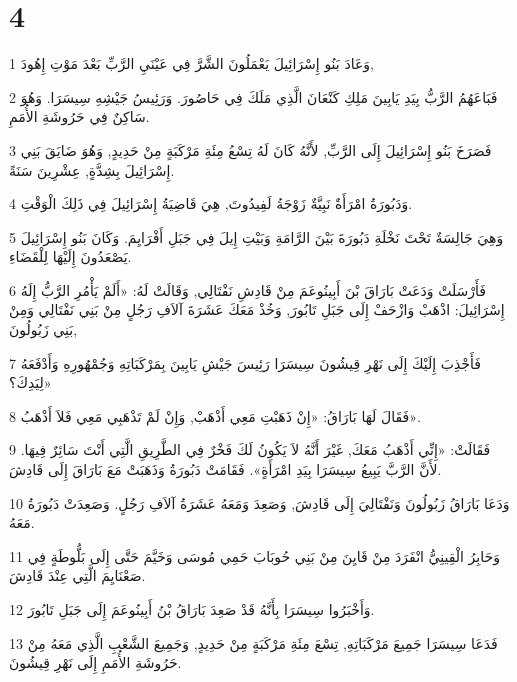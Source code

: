 \chapter{4}

\par 1 وَعَادَ بَنُو إِسْرَائِيلَ يَعْمَلُونَ الشَّرَّ فِي عَيْنَيِ الرَّبِّ بَعْدَ مَوْتِ إِهُودَ,
\par 2 فَبَاعَهُمُ الرَّبُّ بِيَدِ يَابِينَ مَلِكِ كَنْعَانَ الَّذِي مَلَكَ فِي حَاصُورَ. وَرَئِيسُ جَيْشِهِ سِيسَرَا. وَهُوَ سَاكِنٌ فِي حَرُوشَةِ الأُمَمِ.
\par 3 فَصَرَخَ بَنُو إِسْرَائِيلَ إِلَى الرَّبِّ, لأَنَّهُ كَانَ لَهُ تِسْعُ مِئَةِ مَرْكَبَةٍ مِنْ حَدِيدٍ, وَهُوَ ضَايَقَ بَنِي إِسْرَائِيلَ بِشِدَّةٍ, عِشْرِينَ سَنَةً.
\par 4 وَدَبُورَةُ امْرَأَةٌ نَبِيَّةٌ زَوْجَةُ لَفِيدُوتَ, هِيَ قَاضِيَةُ إِسْرَائِيلَ فِي ذَلِكَ الْوَقْتِ.
\par 5 وَهِيَ جَالِسَةٌ تَحْتَ نَخْلَةِ دَبُورَةَ بَيْنَ الرَّامَةِ وَبَيْتِ إِيلَ فِي جَبَلِ أَفْرَايِمَ. وَكَانَ بَنُو إِسْرَائِيلَ يَصْعَدُونَ إِلَيْهَا لِلْقَضَاءِ.
\par 6 فَأَرْسَلَتْ وَدَعَتْ بَارَاقَ بْنَ أَبِينُوعَمَ مِنْ قَادِشِ نَفْتَالِي, وَقَالَتْ لَهُ: «أَلَمْ يَأْمُرِ الرَّبُّ إِلَهُ إِسْرَائِيلَ: اذْهَبْ وَازْحَفْ إِلَى جَبَلِ تَابُورَ, وَخُذْ مَعَكَ عَشَرَةَ آلاَفِ رَجُلٍ مِنْ بَنِي نَفْتَالِي وَمِنْ بَنِي زَبُولُونَ,
\par 7 فَأَجْذِبَ إِلَيْكَ إِلَى نَهْرِ قِيشُونَ سِيسَرَا رَئِيسَ جَيْشِ يَابِينَ بِمَرْكَبَاتِهِ وَجُمْهُورِهِ وَأَدْفَعَهُ لِيَدِكَ؟»
\par 8 فَقَالَ لَهَا بَارَاقُ: «إِنْ ذَهَبْتِ مَعِي أَذْهَبْ, وَإِنْ لَمْ تَذْهَبِي مَعِي فَلاَ أَذْهَبُ».
\par 9 فَقَالَتْ: «إِنِّي أَذْهَبُ مَعَكَ, غَيْرَ أَنَّهُ لاَ يَكُونُ لَكَ فَخْرٌ فِي الطَّرِيقِ الَّتِي أَنْتَ سَائِرٌ فِيهَا. لأَنَّ الرَّبَّ يَبِيعُ سِيسَرَا بِيَدِ امْرَأَةٍ». فَقَامَتْ دَبُورَةُ وَذَهَبَتْ مَعَ بَارَاقَ إِلَى قَادِشَ.
\par 10 وَدَعَا بَارَاقُ زَبُولُونَ وَنَفْتَالِيَ إِلَى قَادِشَ, وَصَعِدَ وَمَعَهُ عَشَرَةُ آلاَفِ رَجُلٍ. وَصَعِدَتْ دَبُورَةُ مَعَهُ.
\par 11 وَحَابِرُ الْقِينِيُّ انْفَرَدَ مِنْ قَايِنَ مِنْ بَنِي حُوبَابَ حَمِي مُوسَى وَخَيَّمَ حَتَّى إِلَى بَلُّوطَةٍ فِي صَعْنَايِمَ الَّتِي عِنْدَ قَادِشَ.
\par 12 وَأَخْبَرُوا سِيسَرَا بِأَنَّهُ قَدْ صَعِدَ بَارَاقُ بْنُ أَبِينُوعَمَ إِلَى جَبَلِ تَابُورَ.
\par 13 فَدَعَا سِيسَرَا جَمِيعَ مَرْكَبَاتِهِ, تِسْعَ مِئَةِ مَرْكَبَةٍ مِنْ حَدِيدٍ, وَجَمِيعَ الشَّعْبِ الَّذِي مَعَهُ مِنْ حَرُوشَةِ الأُمَمِ إِلَى نَهْرِ قِيشُونَ.
